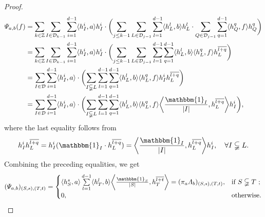 \documentclass[oneside,english,a4wide]{amsart}
\numberwithin{equation}{section}
\numberwithin{figure}{section}
\theoremstyle{plain}
\theoremstyle{plain}
\theoremstyle{definition}
\theoremstyle{plain}
\theoremstyle{remark}
\theoremstyle{definition}
\theoremstyle{remark}
\theoremstyle{definition}
\newcommand{\8}{\infty}
\begin{document}
\begin{proof}
\begin{equation*}
\begin{aligned}
			\varPsi_{a,b}(f){}&=\sum_{k\in\mathbb{Z}}\sum_{I\in\mathcal{D}_{k-1}}\sum_{i=1}^{d-1}\langle h_I^i,a\rangle h_I^i \cdot \biggl(\sum_{j\le k-1}\sum_{L\in \mathcal{D}_{j-1}}\sum_{l=1}^{d-1}\langle h_L^l,b\rangle h_L^l \cdot \sum_{Q\in \mathcal{D}_{j-1}}\sum_{q=1}^{d-1}\langle h_Q^q,f\rangle h_Q^q\biggr)\\
			&=\sum_{k\in\mathbb{Z}}\sum_{I\in\mathcal{D}_{k-1}}\sum_{i=1}^{d-1}\langle h_I^i,a\rangle h_I^i \cdot \biggl(\sum_{j\le k-1}\sum_{L\in \mathcal{D}_{j-1}}\sum_{l=1}^{d-1}\sum_{q=1}^{d-1}\langle h_L^l,b\rangle \langle h_L^q,f\rangle h_L^{\overline{l+q}}\biggr)\\
			&=\sum_{I\in\mathcal{D}}\sum_{i=1}^{d-1}\langle h_I^i,a\rangle\cdot \biggl(\sum_{I\subsetneqq L}\sum_{l=1}^{d-1}\sum_{q=1}^{d-1}\langle h_L^l,b\rangle \langle h_L^q,f\rangle h_I^i h_L^{\overline{l+q}}\biggr)\\
			&=\sum_{I\in\mathcal{D}}\sum_{i=1}^{d-1}\langle h_I^i,a\rangle\cdot \biggl(\sum_{I\subsetneqq L}\sum_{l=1}^{d-1}\sum_{q=1}^{d-1}\langle h_L^l,b\rangle \langle h_L^q,f\rangle  \bigg\langle \frac{\mathbbm{1}_I}{|I|},h_L^{\overline{l+q}}\bigg\rangle h_I^i\biggr),
		\end{aligned}
	\end{equation*}
	where the last equality follows from 
	$$  h_I^i h_L^{\overline{l+q}}=h_I^i (\mathbbm{1}_I\cdot h_L^{\overline{l+q}})= \bigg\langle \frac{\mathbbm{1}_I}{|I|},h_L^{\overline{l+q}}\bigg\rangle h_I^i, \quad \forall  I\subsetneqq L.$$
	Combining the preceding equalities, we get 
	\begin{equation}\label{pusiab2}
		\begin{aligned}
			(\varPsi_{a,b})_{(S,s),(T,t)}=
			\begin{cases}
				\langle h_S^s,a\rangle \sum\limits_{l=1}^{d-1}\langle h_T^l,b\rangle \bigg\langle \frac{\mathbbm{1}_S}{|S|},h_T^{\overline{l+t}}\bigg\rangle=(\pi_a\varLambda_b)_{(S,s),(T,t)} ,& \text{if $S\subsetneqq T$ };\\
				0,& \text{otherwise}.
			\end{cases}
		\end{aligned}
	\end{equation}

\end{proof}
\end{document}
